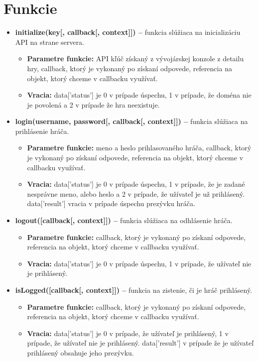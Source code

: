 \section{Funkcie}
\begin{itemize}
\item \textbf{initialize(key[, callback[, context]]) –} funkcia slúžiaca na inicializáciu API na strane servera. 
\begin{itemize}
\item \textbf{Parametre funkcie:} API kľúč získaný z vývojárskej konzole z detailu hry, callback, ktorý je vykonaný po získaní odpovede, referencia na objekt, ktorý chceme v callbacku využívať. 
\item \textbf{Vracia:} data['status'] je 0 v prípade úspechu, 1 v prípade, že doména nie je povolená a 2 v prípade že hra neexistuje.
\end{itemize}

\item \textbf{login(username, password[, callback[, context]]) –} funkcia slúžiaca na prihlásenie hráča.
\begin{itemize}
\item \textbf{Parametre funkcie:} meno a heslo prihlasovaného hráča, callback, ktorý je vykonaný po získaní odpovede, referencia na objekt, ktorý chceme v callbacku využívať. 
\item \textbf{Vracia:} data['status'] je 0 v prípade úspechu, 1 v prípade, že je zadané nesprávne meno, alebo heslo a 2 v prípade, že užívateľ je už prihlásený. data['result'] vracia v prípade úspechu prezývku hráča.
\end{itemize}

\item \textbf{logout([callback[, context]]) –} funkcia slúžiaca na odhlásenie hráča.
\begin{itemize}
\item \textbf{Parametre funkcie:} callback, ktorý je vykonaný po získaní odpovede, referencia na objekt, ktorý chceme v callbacku využívať. 
\item \textbf{Vracia:} data['status'] je 0 v prípade úspechu, 1 v prípade, že užívateľ nie je prihlásený.
\end{itemize}

\item \textbf{isLogged([callback[, context]]) –} funkcia na zistenie, či je hráč prihlásený.
\begin{itemize}
\item \textbf{Parametre funkcie:} callback, ktorý je vykonaný po získaní odpovede, referencia na objekt, ktorý chceme v callbacku využívať. 
\item \textbf{Vracia:} data['status'] je 0 v prípade, že užívateľ je prihlásený, 1 v prípade, že užívateľ nie je prihlásený. data['result'] v prípade že je užívateľ prihlásený obsahuje jeho prezývku.
\end{itemize}


\end{itemize}

